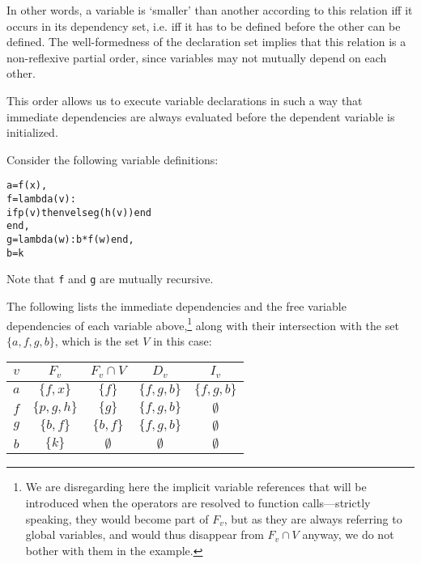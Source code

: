 In other words, a variable is `smaller' than another according to this
relation iff it occurs in its dependency set, i.e. iff it has to be
defined before the other can be defined. The well-formedness of the
declaration set implies that this relation is a non-reflexive partial
order, since variables may not mutually depend on each other.

This order allows us to execute variable declarations in such a way
that immediate dependencies are always evaluated before the dependent
variable is initialized.

\begin{example}
Consider the following variable definitions:
\begin{alltt}
  a = f(x),
  f = lambda (v) : 
      if p(v) then v else g(h(v)) end
  end,
  g = lambda (w) : b * f(w) end,
  b = k
\end{alltt}

Note that {\tt f} and {\tt g} are mutually recursive.

The following lists the immediate dependencies and the free variable
dependencies of each variable above,\footnote{We are disregarding here
  the implicit variable references that will be introduced when the
  operators are resolved to function calls---strictly speaking, they
  would become part of $F_v$, but as they are always referring to
  global variables, and would thus disappear from $F_v\cap V$ anyway,
  we do not bother with them in the example.} along with their
intersection with the set $\{a, f, g, b\}$, which is the set $V$ in
this case:

\begin{center}
\begin{tabular}[h]{c|c|c|c|c}
$v$   &    $F_v$   & $F_v \cap V$ & $D_v$  & $I_v$  \\
\hline\hline
$a$   &  $\{f, x\}$ & $\{f\}$   &  $\{f, g, b\}$ &  $\{f, g, b\}$  \\\hline
$f$   &  $\{p, g, h\}$ &  $\{g\}$  &  $\{f, g, b\}$  &  $\emptyset$ \\\hline
$g$   &  $\{b, f\}$ &  $\{b, f\}$  &  $\{f, g, b\}$ & $\emptyset$ \\\hline
$b$   &  $\{k\}$ & $\emptyset$   & $\emptyset$  & $\emptyset$ \\\hline
\end{tabular}
\end{center}\vspace{4mm}


\end{example}
